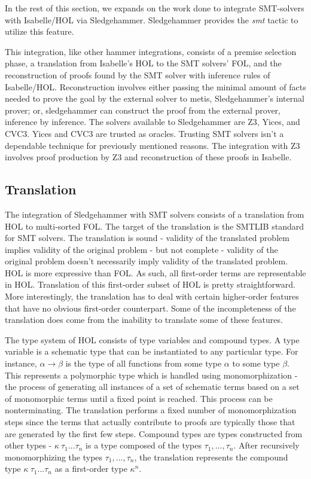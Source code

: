 \documentclass{article}
\begin{document}
	In the rest of this section, we expands on the work 
	done to integrate SMT-solvers with Isabelle/HOL via 
	Sledgehammer. Sledgehammer provides the \textit{smt}
	tactic to utilize this feature.
	
	This integration, like other hammer integrations, 
	consists of a premise selection phase, a translation 
	from Isabelle's HOL to the SMT solvers' FOL, and the 
	reconstruction of proofs found by the SMT solver with 
	inference rules of Isabelle/HOL. Reconstruction involves 
	either passing the minimal amount of facts needed 
	to prove the goal by the external solver to metis, 
	Sledgehammer's internal prover; or, sledgehammer 
	can construct the proof from the external prover, 
	inference by inference.	The solvers available to 
	Sledgehammer are Z3, Yices, and CVC3. Yices and CVC3 
	are trusted as oracles.	Trusting SMT solvers isn't a 
	dependable technique for previously mentioned reasons. The 
	integration with Z3 involves proof production by 
	Z3 and reconstruction of these proofs in Isabelle.
	
	\subsection{Translation}
		The integration of Sledgehammer with SMT solvers 
		consists of a translation from HOL 
		to multi-sorted FOL. The target 
		of the translation is the SMTLIB standard for 
		SMT solvers. The translation is sound - 
		validity of the translated problem implies 
		validity of the original problem - but not 
		complete - validity of the original problem 
		doesn't necessarily imply validity of the 
		translated problem. HOL is more expressive 
		than FOL. As such, all first-order terms 
		are representable in HOL. Translation of this 
		first-order subset of HOL is pretty straightforward. 
		More interestingly, the translation has to deal 
		with certain higher-order features that have 
		no obvious first-order counterpart. Some of 
		the incompleteness of the translation does 
		come from the inability to translate some 
		of these features.
		
		The type system of HOL consists 
		of type variables and compound types.
		A type variable is a schematic type that 
		can be instantiated to any particular type.
		For instance, $\alpha \to \beta$ is the type
		of all functions from some type $\alpha$ to
		some type $\beta$. This represents a 
		polymorphic type which is handled using 
		monomorphization - the process of generating
		all instances of a set of schematic terms based 
		on a set of monomorphic terms until a fixed point
		is reached. This process can be nonterminating. 
		The translation performs a fixed number of 
		monomorphization steps since the terms that 
		actually contribute to proofs are 
		typically those that are generated by the 
		first few steps. Compound types 
		are types constructed from other types - 
		$\kappa\ \tau_1 ... \tau_n$ is a type composed of 
		the types $\tau_1, ..., \tau_n$. After 
		recursively monomorphizing the types 
		$\tau_1, ..., \tau_n$, the translation 
		represents the compound type 
		$\kappa\ \tau_1 ... \tau_n$ as a first-order 
		type $\kappa^n$.
		
\end{document}
